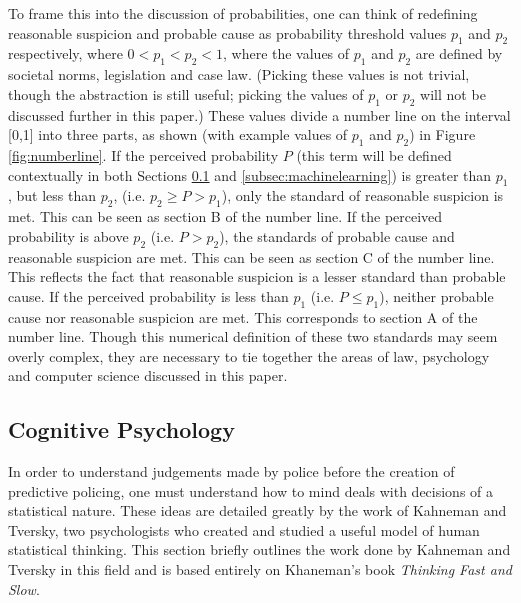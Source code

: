 \documentclass[12pt]{article} %
\begin{document}
To frame this into the discussion of probabilities, one can think of redefining reasonable suspicion and probable cause as probability threshold values $p_1$ and $p_2$ respectively, where $0 < p_1 < p_2 < 1$, where the values of $p_1$ and $p_2$ are defined by societal norms, legislation and case law. (Picking these values is not trivial, though the abstraction is still useful; picking the values of $p_1$ or $p_2$ will not be discussed further in this paper.) These values divide a number line on the interval [0,1] into three parts, as shown (with example values of $p_1$ and $p_2$) in Figure \ref{fig:numberline}. If the perceived probability $P$ (this term will be defined contextually in both Sections \ref{subsec:cognitive} and \ref{subsec:machinelearning}) is greater than $p_1$, but less than $p_2$, (i.e. $p_2 \geq P > p_1$), only the standard of reasonable suspicion is met. This can be seen as section B of the number line. If the perceived probability is above $p_2$ (i.e. $P > p_2$), the standards of probable cause and reasonable suspicion are met. This can be seen as section C of the number line. This reflects the fact that reasonable suspicion is a lesser standard than probable cause. If the perceived probability is less than $p_1$ (i.e. $P \leq p_1$), neither probable cause nor reasonable suspicion are met. This corresponds to section A of the number line. Though this numerical definition of these two standards may seem overly complex, they are necessary to tie together the areas of law, psychology and computer science discussed in this paper.

\subsection{Cognitive Psychology} \label{subsec:cognitive}
In order to understand judgements made by police before the creation of predictive policing, one must understand how to mind deals with decisions of a statistical nature. These ideas are detailed greatly by the work of Kahneman and Tversky, two psychologists who created and studied a useful model of human statistical thinking. This section briefly outlines the work done by Kahneman and Tversky in this field and is based entirely on Khaneman's book \textit{Thinking Fast and Slow}.\cite{kahneman}
\end{document}
